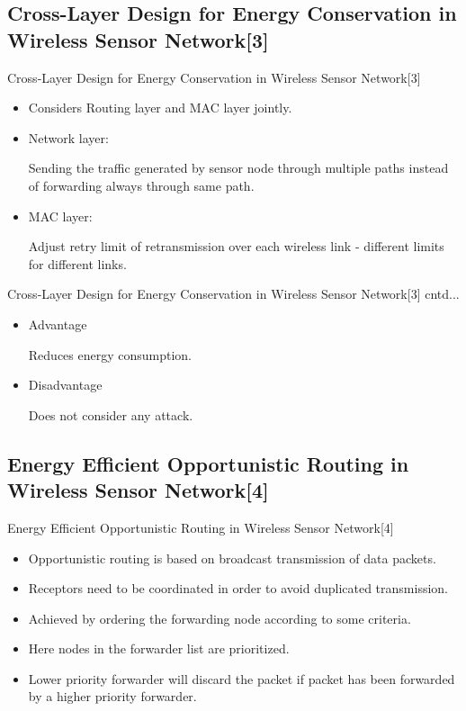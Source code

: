 \subsection{Cross-Layer Design for Energy Conservation in Wireless Sensor Network[3]}
\begin{frame}{Cross-Layer Design for Energy Conservation in Wireless Sensor Network[3]}
\begin{itemize}
\item Considers Routing layer and MAC layer jointly.
\item Network layer:

 Sending the traffic generated by sensor node through multiple paths instead of forwarding always through same path.

\item MAC layer:

 Adjust retry limit of retransmission over each wireless link - different limits for different links.

\end{itemize}
\end{frame}

\begin{frame}{Cross-Layer Design for Energy Conservation in Wireless Sensor Network[3] cntd...}
\begin{itemize}
\item Advantage 

Reduces energy consumption.
\item Disadvantage

Does not consider any attack.
\end{itemize}
\end{frame}

\subsection{Energy Efficient Opportunistic Routing in Wireless Sensor Network[4]}
\begin{frame}{Energy Efficient Opportunistic Routing in Wireless Sensor Network[4]}
\begin{itemize}
\item Opportunistic routing is based on broadcast transmission of data packets.
\item Receptors need to be coordinated in order to avoid duplicated transmission.
\item Achieved by ordering the forwarding node according to some criteria.
\item Here nodes in the forwarder list are prioritized.
\item Lower priority forwarder will discard the packet if packet has been forwarded by a higher priority forwarder.
\end{itemize}
\end{frame}

